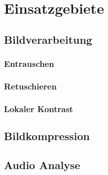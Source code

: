 \documentclass[12pt, a4paper, ngerman]{article}
\begin{document}
\section{Einsatzgebiete}
\subsection{Bildverarbeitung}
\subsubsection{Entrauschen}
\subsubsection{Retuschieren}
\subsubsection{Lokaler Kontrast}
\subsection{Bildkompression}
\subsection{Audio Analyse}

\newpage
\printbibliography
\end{document}

